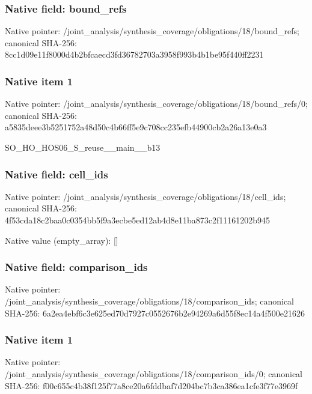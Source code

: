 \documentclass[10pt,a4paper]{article}
\begin{document}
\subsubsection{Native field: bound\_\allowbreak{}refs}
Native pointer: /joint\_\allowbreak{}analysis/synthesis\_\allowbreak{}coverage/obligations/18/bound\_\allowbreak{}refs; canonical SHA-256: 8cc1d09e11f8000d4b2bfcaecd3fd36782703a3958f993b4b1be95f440ff2231

\subsubsection{Native item 1}
Native pointer: /joint\_\allowbreak{}analysis/synthesis\_\allowbreak{}coverage/obligations/18/bound\_\allowbreak{}refs/0; canonical SHA-256: a5835deee3b5251752a48d50c4b66ff5e9c708cc235efb44900cb2a26a13e0a3

\begingroup\raggedright\sloppy SO\_\allowbreak{}HO\_\allowbreak{}HOS06\_\allowbreak{}S\_\allowbreak{}reuse\_\allowbreak{}\_\allowbreak{}main\_\allowbreak{}\_\allowbreak{}b13\par\endgroup

\subsubsection{Native field: cell\_\allowbreak{}ids}
Native pointer: /joint\_\allowbreak{}analysis/synthesis\_\allowbreak{}coverage/obligations/18/cell\_\allowbreak{}ids; canonical SHA-256: 4f53cda18c2baa0c0354bb5f9a3ecbe5ed12ab4d8e11ba873c2f11161202b945

Native value (empty\_\allowbreak{}array): []

\subsubsection{Native field: comparison\_\allowbreak{}ids}
Native pointer: /joint\_\allowbreak{}analysis/synthesis\_\allowbreak{}coverage/obligations/18/comparison\_\allowbreak{}ids; canonical SHA-256: 6a2ea4ebf6c3e625ed70d7927c0552676b2e94269a6d55f8ec14a4f500e21626

\subsubsection{Native item 1}
Native pointer: /joint\_\allowbreak{}analysis/synthesis\_\allowbreak{}coverage/obligations/18/comparison\_\allowbreak{}ids/0; canonical SHA-256: f00c655c4b38f125f77a8ce20a6fddbaf7d204bc7b3ca386ea1cfe3f77e3969f
\end{document}
